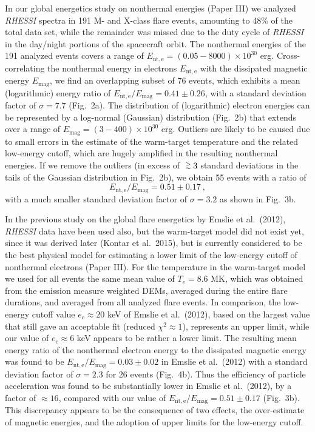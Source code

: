 \documentclass[10pt,preprint]{aastex}  %
\def\gapprox{\lower.4ex\hbox{$\;\buildrel >\over{\scriptstyle\sim}\;$}}
\begin{document}
In our global energetics study on nonthermal energies (Paper III)
we analyzed {\it RHESSI} spectra in 191 M- and X-class flare events,
amounting to 48\% of the total data set, while the remainder
was missed due to the duty cycle
of {\it RHESSI} in the day/night portions of the spacecraft orbit.
The nonthermal energies of the 191 analyzed events covers a range of 
$E_{\mathrm{nt,e}} = (0.05 - 8000) \times 10^{30}$ erg.
Cross-correlating the nonthermal energy in electrons $E_{\mathrm{nt,e}}$ with
the dissipated magnetic energy $E_{\mathrm{mag}}$, we find an overlapping
subset of 76 events, which exhibits a mean (logarithmic)
energy ratio of $E_{\mathrm{nt,e}}/E_{\mathrm{mag}} = 0.41 \pm 0.26$, with a standard
deviation factor of $\sigma=7.7$ (Fig.~2a). The distribution
of (logarithmic) electron energies can be represented by a 
log-normal (Gaussian) distribution (Fig.~2b) that extends over a
range of $E_{\mathrm{mag}} = (3 - 400) \times 10^{30}$ erg.
Outliers are likely to be caused due to small errors in the estimate
of the warm-target temperature and the related low-energy cutoff, 
which are hugely amplified in the resulting nonthermal energies.
If we remove the outliers (in excess of $\gapprox 3$ standard
deviations in the tails of the Gaussian distribution in Fig.~2b), 
we obtain 55 events with a ratio of
\begin{equation}
	E_{\mathrm{nt,e}}/E_{\mathrm{mag}} = 0.51 \pm 0.17 \ ,
\end{equation} 
with a much smaller standard deviation factor of $\sigma=3.2$ 
as shown in Fig.~3b. 

In the previous study on the global flare energetics by 
Emslie et al.~(2012), {\it RHESSI} data have been used also, but the
warm-target model did not exist yet, since it was derived later
(Kontar et al.~2015), but is currently considered to be the best 
physical model for estimating a lower limit of the low-energy cutoff 
of nonthermal electrons (Paper III). For the temperature in the warm-target
model we used for all events the same mean value of $T_e=8.6$ MK,
which was obtained from the emission measure weighted DEMs, averaged 
during the entire flare durations, and averaged from all 
analyzed flare events.
In comparison, the low-energy cutoff value 
$e_c \approx 20$ keV of Emslie et al.~(2012), based on
the largest value that still gave an acceptable fit 
(reduced $\chi^2 \approx 1$), represents an upper limit,
while our value of $e_c \approx 6$ keV appears to be rather 
a lower limit.  The resulting
mean energy ratio of the nonthermal electron energy to the dissipated
magnetic energy was found to be 
$E_{\mathrm{nt,e}}/E_{\mathrm{mag}} = 0.03 \pm 0.02$ in Emslie et al.~(2012)
with a standard deviation factor of $\sigma=2.3$ for 
26 events (Fig.~4b). Thus the efficiency of particle acceleration
was found to be substantially lower in Emslie et al.~(2012), 
by a factor of $\approx 16$, compared with our value of 
$E_{\mathrm{nt,e}}/E_{\mathrm{mag}} 
= 0.51 \pm 0.17$ (Fig.~3b). This discrepancy appears to be the
consequence of two effects, the over-estimate of magnetic energies, 
and the adoption of upper limits for the low-energy cutoff.
\end{document}
